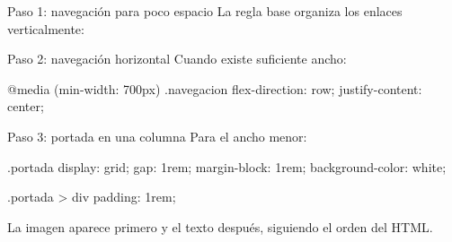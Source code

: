 \documentclass[aspectratio=169,11pt]{beamer}
\begin{document}
    \begin{frame}[fragile]{Paso 1: navegación para poco espacio}
        La regla base organiza los enlaces verticalmente:

    \end{frame}

    \begin{frame}[fragile]{Paso 2: navegación horizontal}
        Cuando existe suficiente ancho:

        \begin{csscodedark}
            @media (min-width: 700px) {
                .navegacion {
                    flex-direction: row;
                    justify-content: center;
                }
            }
        \end{csscodedark}

    \end{frame}

    \begin{frame}[fragile]{Paso 3: portada en una columna}
        Para el ancho menor:

        \begin{csscodedark}
            .portada {
                display: grid;
                gap: 1rem;
                margin-block: 1rem;
                background-color: white;
            }

            .portada > div {
                padding: 1rem;
            }
        \end{csscodedark}

        La imagen aparece primero y el texto después, siguiendo el orden del HTML.
    \end{frame}
\end{document}
